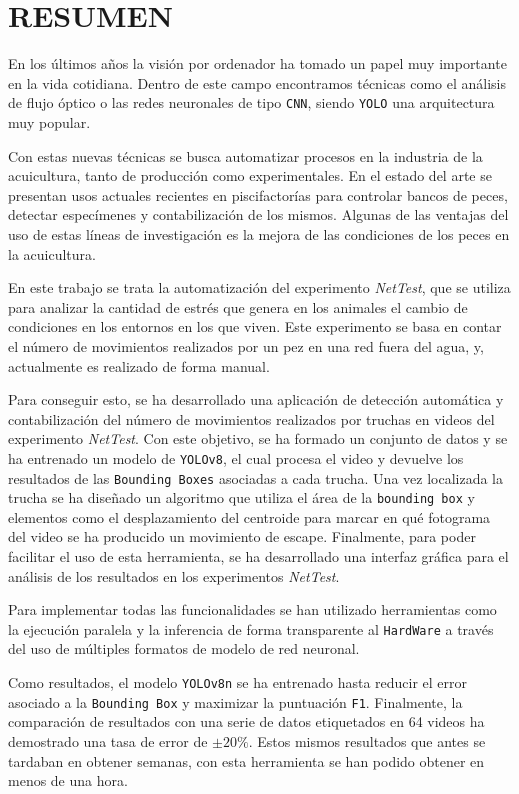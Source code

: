 \section*{RESUMEN}
\thispagestyle{abstract}
En los últimos años la visión por ordenador ha tomado un papel muy importante en la vida cotidiana. Dentro de este campo encontramos técnicas como el análisis de 
flujo óptico o las redes neuronales de tipo \texttt{CNN}, siendo \texttt{YOLO} una arquitectura muy popular.

Con estas nuevas técnicas se busca automatizar procesos en la industria de la acuicultura, tanto de producción como experimentales. En el estado del arte se presentan 
usos actuales recientes en piscifactorías para controlar bancos de peces, detectar especímenes y contabilización de los mismos. Algunas de las ventajas del uso de estas 
líneas de investigación es la mejora de las condiciones de los peces en la acuicultura. 

En este trabajo se trata la automatización del experimento \textit{NetTest}, que se utiliza para analizar la cantidad de estrés que genera en los animales el cambio de 
condiciones en los entornos en los que viven. Este experimento se basa en contar el número de movimientos realizados por un pez en una red fuera del agua, y, actualmente 
es realizado de forma manual.

Para conseguir esto, se ha desarrollado una aplicación de detección automática y contabilización del número de movimientos realizados por truchas en videos del experimento 
\textit{NetTest}. Con este objetivo, se ha formado un conjunto de datos y se ha entrenado un modelo de \texttt{YOLOv8}, el cual procesa el video y devuelve los resultados de 
las \texttt{Bounding Boxes} asociadas a cada trucha.\newline
Una vez localizada la trucha se ha diseñado un algoritmo que utiliza el área de la \texttt{bounding box} y elementos como el desplazamiento del centroide para marcar en qué 
fotograma del video se ha producido un movimiento de escape. Finalmente, para poder facilitar el uso de esta herramienta, se ha desarrollado una interfaz gráfica para 
el análisis de los resultados en los experimentos \textit{NetTest}.

Para implementar todas las funcionalidades se han utilizado herramientas como la ejecución paralela y la inferencia de forma transparente al \texttt{HardWare} a través del uso 
de múltiples formatos de modelo de red neuronal.

Como resultados, el modelo \texttt{YOLOv8n} se ha entrenado hasta reducir el error asociado a la \texttt{Bounding Box} y maximizar la puntuación \texttt{F1}. Finalmente, la 
comparación de resultados con una serie de datos etiquetados en 64 videos ha demostrado una tasa de error de \texttt{$ \pm 20\% $}. Estos mismos resultados que antes se tardaban 
en obtener semanas, con esta herramienta se han podido obtener en menos de una hora.